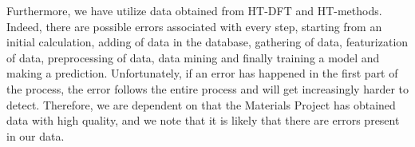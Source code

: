Furthermore, we have utilize data obtained from HT-DFT and HT-methods. Indeed, there are possible errors associated with every step, starting from an initial calculation, adding of data in the database, gathering of data, featurization of data, preprocessing of data, data mining and finally training a model and making a prediction. Unfortunately, if an error has happened in the first part of the process, the error follows the entire process and will get increasingly harder to detect. Therefore, we are dependent on that the Materials Project has obtained data with high quality, and we note that it is likely that there are errors present in our data. %

